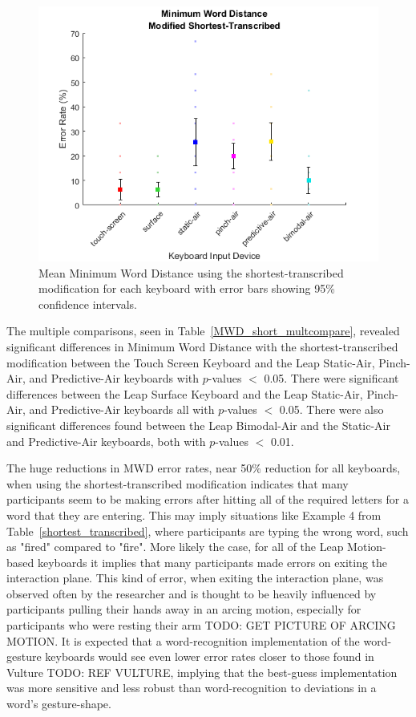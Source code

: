 \begin{figure}[h]
	\centering
	\includegraphics{fig_MWD_short_mean}
	\caption[Mean Minimum Word Distance for Modified-Shortest]{Mean Minimum Word Distance using the shortest-transcribed modification for each keyboard with error bars showing 95\% confidence intervals.}
	\label{fig_MWD_short_mean}
\end{figure}

The multiple comparisons, seen in Table~\ref{MWD_short_multcompare}, revealed significant differences in Minimum Word Distance with the shortest-transcribed modification between the Touch Screen Keyboard and the Leap Static-Air, Pinch-Air, and Predictive-Air keyboards with $p$-values $<$ 0.05. There were significant differences between the Leap Surface Keyboard and the Leap Static-Air, Pinch-Air, and Predictive-Air keyboards all with $p$-values $<$ 0.05. There were also significant differences found between the Leap Bimodal-Air and the Static-Air and Predictive-Air keyboards, both with $p$-values $<$ 0.01.

The huge reductions in MWD error rates, near 50\% reduction for all keyboards, when using the shortest-transcribed modification indicates that many participants seem to be making errors after hitting all of the required letters for a word that they are entering. This may imply situations like Example 4 from Table~\ref{shortest_transcribed}, where participants are typing the wrong word, such as "fired" compared to "fire". More likely the case, for all of the Leap Motion-based keyboards it implies that many participants made errors on exiting the interaction plane. This kind of error, when exiting the interaction plane, was observed often by the researcher and is thought to be heavily influenced by participants pulling their hands away in an arcing motion, especially for participants who were resting their arm TODO: GET PICTURE OF ARCING MOTION. It is expected that a word-recognition implementation of the word-gesture keyboards would see even lower error rates closer to those found in Vulture TODO: REF VULTURE, implying that the best-guess implementation was more sensitive and less robust than word-recognition to deviations in a word's gesture-shape.

